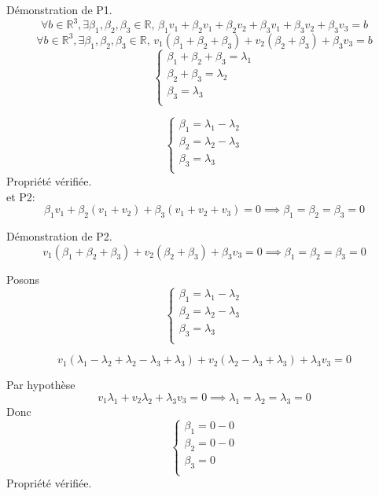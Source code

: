 \documentclass[]{book}
\theoremstyle{definition}
\newcommand{\bb}[1]{\mathbb{#1}}
\newcommand{\R}{\bb{R}}
\begin{document}
D\'emonstration de P1.
$$ \forall b \in \R^3, \exists \beta_1,\beta_2,\beta_3 \in \R,\,
\beta_1 v_{1} + \beta_2 v_{1} + \beta_2 v_{2} +\beta_3 v_{1} + \beta_3 v_{2} + \beta_3 v_{3} = b
$$
$$ \forall b \in \R^3, \exists \beta_1,\beta_2,\beta_3 \in \R,\,
v_{1} (\beta_1 + \beta_2 + \beta_3) + v_{2} (\beta_2 + \beta_3) + \beta_3 v_{3} = b
$$
$$
\left\{ 
\begin{array}{l}
   \beta_1 + \beta_2 + \beta_3 = \lambda_1 \\
   \beta_2 + \beta_3 = \lambda_2 \\
   \beta_3 = \lambda_3 \\
\end{array}
\right. 
$$

$$
\left\{ 
\begin{array}{l}
   \beta_1 = \lambda_1 - \lambda_2 \\
   \beta_2 = \lambda_2 - \lambda_3 \\
   \beta_3 = \lambda_3 \\
\end{array}
\right. 
$$
Propri\'et\'e v\'erifi\'ee.\\


et P2:
$$
\beta_1 v_{1} +\beta_2 (v_{1} + v_{2}) + \beta_3 (v_{1} + v_{2} + v_{3}) = 0
\implies
\beta_1=\beta_2=\beta_3=0
$$

D\'emonstration de P2.
$$
v_{1} (\beta_1 + \beta_2 + \beta_3) + v_{2} (\beta_2 + \beta_3) + \beta_3 v_{3} = 0
\implies
\beta_1=\beta_2=\beta_3=0
$$

Posons
$$
\left\{ 
\begin{array}{l}
   \beta_1 = \lambda_1 - \lambda_2 \\
   \beta_2 = \lambda_2 - \lambda_3 \\
   \beta_3 = \lambda_3 \\
\end{array}
\right.
$$

$$ 
v_{1} (\lambda_1 - \lambda_2 + \lambda_2 - \lambda_3 + \lambda_3) + v_{2} (\lambda_2 - \lambda_3 + \lambda_3) + \lambda_3 v_{3} = 0
$$

Par hypoth\`ese
$$ 
v_{1} \lambda_1 + v_{2} \lambda_2 + \lambda_3 v_{3} = 0 \implies \lambda_1=\lambda_2=\lambda_3=0
$$
Donc
$$
\left\{ 
\begin{array}{l}
   \beta_1 = 0 - 0 \\
   \beta_2 = 0 - 0 \\
   \beta_3 = 0 \\
\end{array}
\right.
$$
Propri\'et\'e v\'erifi\'ee.\\
\end{document}
